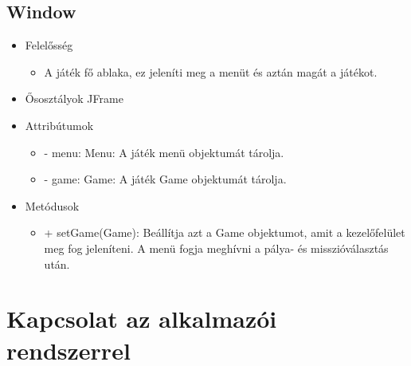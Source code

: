 \subsection{Window}
\begin{itemize}
\item Felelősség
\begin{itemize}
	\item A játék fő ablaka, ez jeleníti meg a menüt és aztán magát a játékot.
\end{itemize}
\item Ősosztályok\newline
JFrame
\item Attribútumok
	\begin{itemize}
		\item - menu: Menu: A játék menü objektumát tárolja.
		\item - game: Game: A játék Game objektumát tárolja.
	\end{itemize}
\item Metódusok
	\begin{itemize}
		\item + setGame(Game): Beállítja azt a Game objektumot, amit a kezelőfelület meg fog jeleníteni. A menü fogja meghívni a pálya- és misszióválasztás után.
	\end{itemize}
\end{itemize}

\section{Kapcsolat az alkalmazói rendszerrel}

